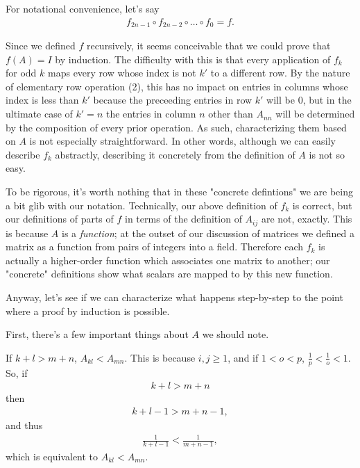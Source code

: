 \documentclass[12pt]{article}
\begin{document}
\begin{enumerate}
    For notational convenience, let's say
    \begin{align*}
      f_{2n-1} \circ f_{2n-2} \circ \ldots \circ f_{0} = f.
    \end{align*}

    Since we defined $f$ recursively, it seems conceivable that
    we could prove that $f(A) = I$ by induction.  The difficulty
    with this is that every application of $f_k$ for odd $k$ maps
    every row whose index is not $k'$ to a different row. By the
    nature of elementary row operation (2), this has no impact on
    entries in columns whose index is less than $k'$ because the
    preceeding entries in row $k'$ will be $0$, but in the
    ultimate case of $k' = n$ the entries in column $n$ other
    than $A_{nn}$ will be determined by the composition of every
    prior operation. As such, characterizing them based on $A$ is
    not especially straightforward. In other words, although we
    can easily describe $f_{k}$ abstractly, describing it
    concretely from the definition of $A$ is not so easy.

    To be rigorous, it's worth nothing that in these "concrete
    defintions" we are being a bit glib with our notation.
    Technically, our above definition of $f_k$ is correct, but
    our definitions of parts of $f$ in terms of the definition of
    $A_{ij}$ are not, exactly. This is because $A$ is a
    \textit{function}; at the outset of our discussion of
    matrices we defined a matrix as a function from pairs of
    integers into a field. Therefore each $f_k$ is actually a
    higher-order function which associates one matrix to another;
    our "concrete" definitions show what scalars are mapped to by
    this new function.

    Anyway, let's see if we can characterize what happens
    step-by-step to the point where a proof by induction is
    possible.

    First, there's a few important things about $A$ we should
    note.

    If $k + l > m + n$, $A_{kl} < A_{mn}$. This is because $i,j
    \geq 1$, and if $1 < o < p$, $\frac{1}{p} < \frac{1}{o} < 1$.
    So, if
    \begin{align*}
      k + l > m + n
    \end{align*}
    then
    \begin{align*}
      k + l - 1 > m + n - 1,
    \end{align*}
    and thus
    \begin{align*}
      \frac{1}{k + l - 1} < \frac{1}{m + n - 1},
    \end{align*}
    which is equivalent to $A_{kl} < A_{mn}$.


\end{enumerate}
\end{document}
